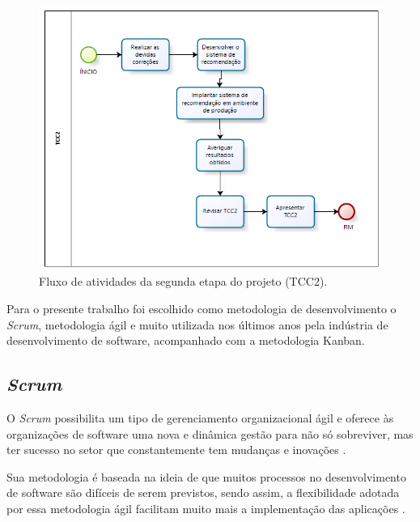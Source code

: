 \begin{figure}[H]
    \centering
    \includegraphics[scale=0.8]{figuras/proposta/fluxo_atividade_tcc2.png}
    \caption[Fluxo de atividades da segunda etapa do projeto (TCC2)]{Fluxo de atividades da segunda etapa do projeto (TCC2).}
    \label{fig:fluxo_atividade_tcc2}
\end{figure}


Para o presente trabalho foi escolhido como metodologia de desenvolvimento o \textit{Scrum}, metodologia ágil e muito utilizada nos últimos anos pela indústria de desenvolvimento de software, acompanhado com a metodologia Kanban.

\subsection{\textit{Scrum}}
\label{section_scrum}

O \textit{Scrum} possibilita um tipo de gerenciamento organizacional ágil e oferece às organizações de software uma nova e dinâmica gestão para não só sobreviver, mas ter sucesso no setor que constantemente tem mudanças e inovações \cite{ijcf94}.

Sua metodologia é baseada na ideia de que muitos processos no desenvolvimento de software são difíceis de serem previstos, sendo assim, a flexibilidade adotada por essa metodologia ágil facilitam muito mais a implementação das aplicações \cite{ijcf94}.

